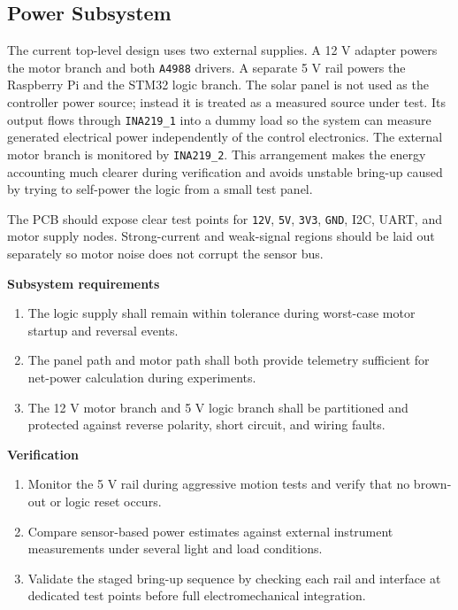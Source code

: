 \documentclass[11pt]{article}
\begin{document}
\subsection{Power Subsystem}
The current top-level design uses two external supplies. A 12 V adapter powers the motor branch and both \texttt{A4988} drivers. A separate 5 V rail powers the Raspberry Pi and the STM32 logic branch. The solar panel is not used as the controller power source; instead it is treated as a measured source under test. Its output flows through \texttt{INA219\_1} into a dummy load so the system can measure generated electrical power independently of the control electronics. The external motor branch is monitored by \texttt{INA219\_2}. This arrangement makes the energy accounting much clearer during verification and avoids unstable bring-up caused by trying to self-power the logic from a small test panel.

The PCB should expose clear test points for \texttt{12V}, \texttt{5V}, \texttt{3V3}, \texttt{GND}, I2C, UART, and motor supply nodes. Strong-current and weak-signal regions should be laid out separately so motor noise does not corrupt the sensor bus.

\textbf{Subsystem requirements}
\begin{enumerate}[label=\arabic*.]
\item The logic supply shall remain within tolerance during worst-case motor startup and reversal events.
\item The panel path and motor path shall both provide telemetry sufficient for net-power calculation during experiments.
\item The 12 V motor branch and 5 V logic branch shall be partitioned and protected against reverse polarity, short circuit, and wiring faults.
\end{enumerate}

\textbf{Verification}
\begin{enumerate}[label=\arabic*.]
\item Monitor the 5 V rail during aggressive motion tests and verify that no brown-out or logic reset occurs.
\item Compare sensor-based power estimates against external instrument measurements under several light and load conditions.
\item Validate the staged bring-up sequence by checking each rail and interface at dedicated test points before full electromechanical integration.
\end{enumerate}
\end{document}
